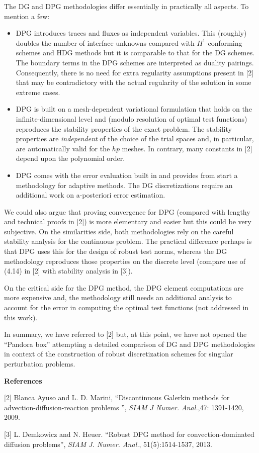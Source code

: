 \documentclass[11pt,c]{article}
\begin{document}
The DG and DPG methodologies differ essentially in practically all aspects. To mention
a few:
\begin{itemize}
  \item DPG introduces traces and fluxes as independent variables. This (roughly) doubles the
number of interface unknowns compared with $H^1$-conforming schemes and HDG methods but it is comparable
to that for the DG schemes. The boundary terms in the DPG schemes are interpreted as duality
pairings. Consequently, there is no need for extra regularity assumptions present in [2] that may be
contradictory with the actual regularity of the solution in  some extreme cases.

  \item DPG is built on a mesh-dependent variational formulation that holds on the infinite-dimensional
level and (modulo resolution of optimal test functions) reproduces the stability properties 
of the exact problem. The stability properties are {\em independent} of the choice of the
trial spaces and, in particular, are automatically valid for the $hp$ meshes. In contrary, many
constants in [2] depend upon the polynomial order.

  \item DPG comes with the error evaluation built in and provides from start a methodology for
adaptive methods. The DG discretizations require an additional work on a-posteriori error estimation.
\end{itemize}

We could also argue that proving convergence for DPG (compared with lengthy and technical proofs in [2])
is more elementary and easier but this could be very subjective. On the similarities side, both methodologies
rely on the careful stability analysis for the continuous problem. The practical difference perhaps is
that DPG uses this for the design of robust test norms, whereas the DG methodology reproduces those properties 
on the discrete level (compare use of (4.14) in [2] with stability analysis in [3]).

On the critical side for the DPG method, the DPG element computations are more expensive and,
the methodology still needs an additional analysis to account for the error in computing the optimal
test functions (not addressed in this work).

In summary, we have referred to [2] but, at this point, we have not opened the ``Pandora box'' attempting
a detailed comparison of DG and DPG methodologies  in context of the construction of robust
discretization schemes for singular perturbation problems.



{\bf References}

[2] Blanca Ayuso and L. D. Marini, ``Discontinuous Galerkin methods for advection-diffusion-reaction problems
'', {\em  SIAM J Numer. Anal.},47: 1391-1420, 2009.

[3] L. Demkowicz and N. Heuer. ``Robust DPG method for convection-dominated diffusion problems'',
{\em SIAM J. Numer. Anal.}, 51(5):1514-1537, 2013.
\end{document}
